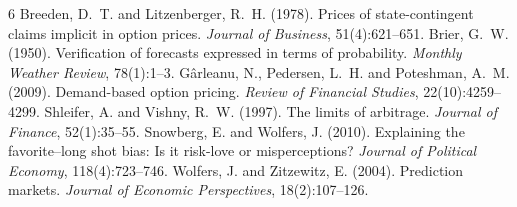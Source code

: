 \documentclass[11pt]{article}
\begin{document}
{
\begin{thebibliography}{6}\setlength{\itemsep}{0pt}\setlength{\parskip}{0pt}
 Breeden, D.~T. and Litzenberger, R.~H. (1978). Prices of state-contingent claims implicit in option prices. \emph{Journal of Business}, 51(4):621--651.
 Brier, G.~W. (1950). Verification of forecasts expressed in terms of probability. \emph{Monthly Weather Review}, 78(1):1--3.
 G\^arleanu, N., Pedersen, L.~H. and Poteshman, A.~M. (2009). Demand-based option pricing. \emph{Review of Financial Studies}, 22(10):4259--4299.
 Shleifer, A. and Vishny, R.~W. (1997). The limits of arbitrage. \emph{Journal of Finance}, 52(1):35--55.
 Snowberg, E. and Wolfers, J. (2010). Explaining the favorite--long shot bias: Is it risk-love or misperceptions? \emph{Journal of Political Economy}, 118(4):723--746.
 Wolfers, J. and Zitzewitz, E. (2004). Prediction markets. \emph{Journal of Economic Perspectives}, 18(2):107--126.
\end{thebibliography}}

\appendix
\end{document}
